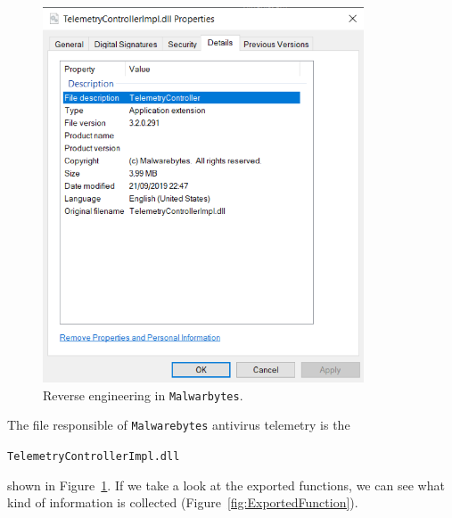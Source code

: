 \begin{figure}[t]
  \centering
  \includegraphics[width=0.85\textwidth]{./figures/ControllerImpl}
  \caption{\label{fig:ControllerImpl} Reverse engineering in
    \texttt{Malwarbytes}.}
\end{figure}
The file responsible of \texttt{Malwarebytes} antivirus telemetry is the
\begin{tcolorbox}
  \texttt{TelemetryControllerImpl.dll}
\end{tcolorbox}
shown in Figure~\ref{fig:ControllerImpl}. If we take a look at the exported
functions, we can see what kind of information is collected
(Figure~\ref{fig:ExportedFunction}).

